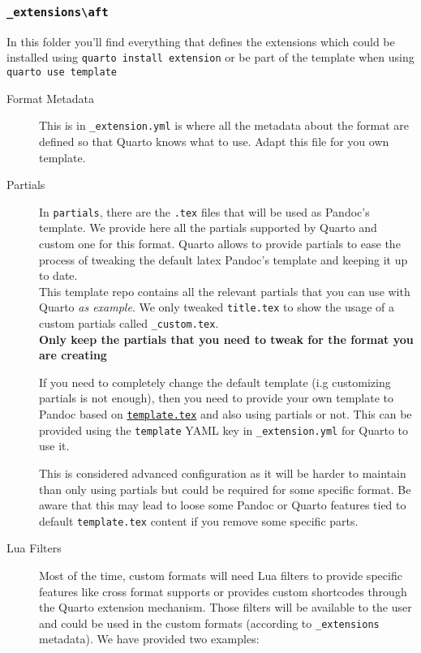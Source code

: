 \documentclass[manuscript,screen,review]{acmart}
\begin{document}
\subsubsection{\texorpdfstring{\texttt{\_extensions\textbackslash{}aft}}{\_extensions\textbackslash aft}}\label{extensionsaft}

In this folder you'll find everything that defines the extensions which
could be installed using \texttt{quarto\ install\ extension} or be part
of the template when using \texttt{quarto\ use\ template}

\begin{description}
\item[Format Metadata]
This is in \texttt{\_extension.yml} is where all the metadata about the
format are defined so that Quarto knows what to use. Adapt this file for
you own template.
\item[Partials]
In \texttt{partials}, there are the \texttt{.tex} files that will be
used as Pandoc's template. We provide here all the partials supported by
Quarto and custom one for this format. Quarto allows to provide partials
to ease the process of tweaking the default latex Pandoc's template and
keeping it up to date.\\
This template repo contains all the relevant partials that you can use
with Quarto \emph{as example}. We only tweaked \texttt{title.tex} to
show the usage of a custom partials called \texttt{\_custom.tex}.\\
\textbf{Only keep the partials that you need to tweak for the format you
are creating}

If you need to completely change the default template (i.g customizing
partials is not enough), then you need to provide your own template to
Pandoc based on
\href{https://github.com/quarto-dev/quarto-cli/blob/main/src/resources/formats/pdf/pandoc/template.tex}{\texttt{template.tex}}
and also using partials or not. This can be provided using the
\texttt{template} YAML key in \texttt{\_extension.yml} for Quarto to use
it.

This is considered advanced configuration as it will be harder to
maintain than only using partials but could be required for some
specific format. Be aware that this may lead to loose some Pandoc or
Quarto features tied to default \texttt{template.tex} content if you
remove some specific parts.
\item[Lua Filters]
Most of the time, custom formats will need Lua filters to provide
specific features like cross format supports or provides custom
shortcodes through the Quarto extension mechanism. Those filters will be
available to the user and could be used in the custom formats (according
to \texttt{\_extensions} metadata). We have provided two examples:


\end{description}
\end{document}
